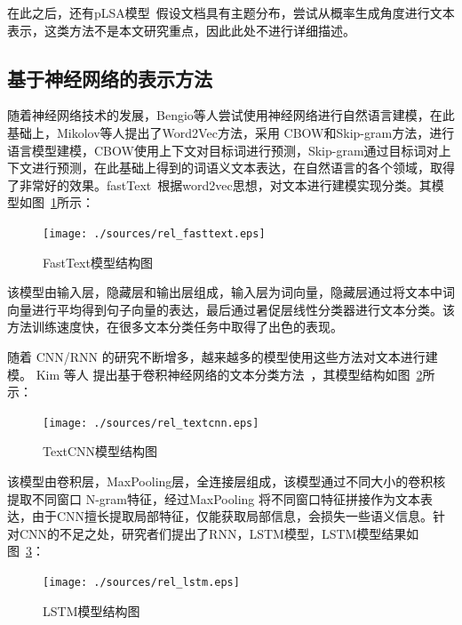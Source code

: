 在此之后，还有pLSA模型~\cite{Hofmann99}假设文档具有主题分布，尝试从概率生成角度进行文本表示，这类方法不是本文研究重点，因此此处不进行详细描述。

\subsection{基于神经网络的表示方法}
随着神经网络技术的发展，Bengio等人尝试使用神经网络进行自然语言建模\cite{BengioDV00}，在此基础上，Mikolov等人提出了Word2Vec方法\cite{abs-1301-3781}，采用 CBOW和Skip-gram方法，进行语言模型建模，CBOW使用上下文对目标词进行预测，Skip-gram通过目标词对上下文进行预测，在此基础上得到的词语义文本表达，在自然语言的各个领域，取得了非常好的效果。fastText~\cite{GraveMJB17}根据word2vec思想，对文本进行建模实现分类。其模型如图~\ref{fig:fasttext}所示：
\begin{figure}[htb]
    \centering
    \texttt{[image: ./sources/rel\_fasttext.eps]}
    \vspace{-10pt}
    \caption{\label{fig:fasttext} FastText模型结构图}
    \vspace{-5pt}
\end{figure}

该模型由输入层，隐藏层和输出层组成，输入层为词向量，隐藏层通过将文本中词向量进行平均得到句子向量的表达，最后通过暑促层线性分类器进行文本分类。该方法训练速度快，在很多文本分类任务中取得了出色的表现。

随着 CNN/RNN 的研究不断增多，越来越多的模型使用这些方法对文本进行建模。 Kim 等人
提出基于卷积神经网络的文本分类方法~\cite{Kim14}，其模型结构如图~\ref{fig:textcnn}所示：
\begin{figure}[htb]
    \centering
    \texttt{[image: ./sources/rel\_textcnn.eps]}
    \vspace{-10pt}
    \caption{\label{fig:textcnn} TextCNN模型结构图}
    \vspace{-5pt}
\end{figure}

该模型由卷积层，MaxPooling层，全连接层组成，该模型通过不同大小的卷积核提取不同窗口 N-gram特征，经过MaxPooling 将不同窗口特征拼接作为文本表达，由于CNN擅长提取局部特征，仅能获取局部信息，会损失一些语义信息。针对CNN的不足之处，研究者们提出了RNN，LSTM模型，LSTM模型结果如图~\ref{fig:lstm}：
\begin{figure}[htb]
    \centering
    \texttt{[image: ./sources/rel\_lstm.eps]}
    \vspace{-10pt}
    \caption{\label{fig:lstm} LSTM模型结构图}
    \vspace{-5pt}
\end{figure}


